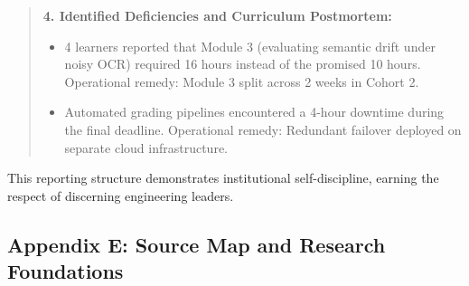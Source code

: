 \begin{quote}
\noindent\textbf{4. Identified Deficiencies and Curriculum Postmortem:}
\begin{itemize}
\item 4 learners reported that Module 3 (evaluating semantic drift under noisy OCR) required 16 hours instead of the promised 10 hours. Operational remedy: Module 3 split across 2 weeks in Cohort 2.
\item Automated grading pipelines encountered a 4-hour downtime during the final deadline. Operational remedy: Redundant failover deployed on separate cloud infrastructure.
\end{itemize}
\end{quote}

This reporting structure demonstrates institutional self-discipline, earning the respect of discerning engineering leaders.

\subsection*{Appendix E: Source Map and Research Foundations}

